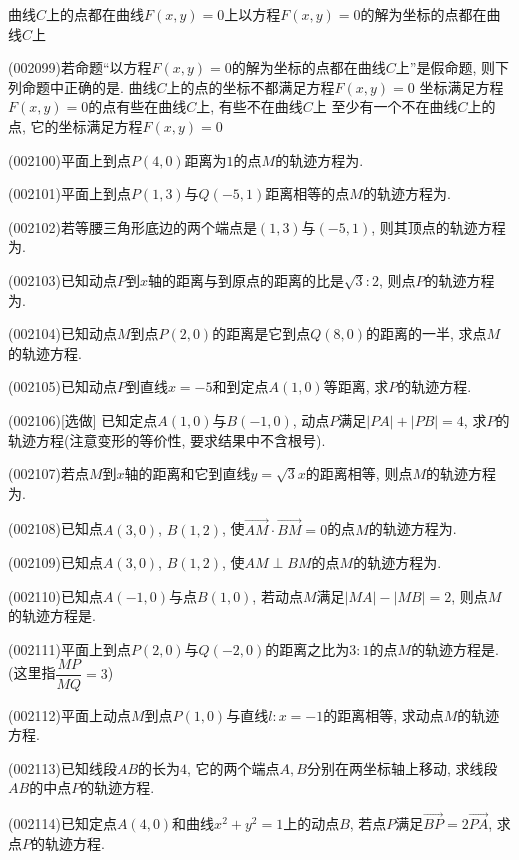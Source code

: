 {曲线$C$上的点都在曲线$F(x,y)=0$上}{以方程$F(x,y)=0$的解为坐标的点都在曲线$C$上}
\item (002099)若命题``以方程$F(x,y)=0$的解为坐标的点都在曲线$C$上''是假命题, 则下列命题中正确的是.
{曲线$C$上的点的坐标不都满足方程$F(x,y)=0$}
{坐标满足方程$F(x,y)=0$的点有些在曲线$C$上, 有些不在曲线$C$上}
{至少有一个不在曲线$C$上的点, 它的坐标满足方程$F(x,y)=0$}
\item (002100)平面上到点$P(4,0)$距离为$1$的点$M$的轨迹方程为.
\item (002101)平面上到点$P(1,3)$与$Q(-5,1)$距离相等的点$M$的轨迹方程为.
\item (002102)若等腰三角形底边的两个端点是$(1,3)$与$(-5,1)$, 则其顶点的轨迹方程为.
\item (002103)已知动点$P$到$x$轴的距离与到原点的距离的比是$\sqrt 3:2$, 则点$P$的轨迹方程为.
\item (002104)已知动点$M$到点$P(2,0)$的距离是它到点$Q(8,0)$的距离的一半, 求点$M$的轨迹方程.
\item (002105)已知动点$P$到直线$x=-5$和到定点$A(1,0)$等距离, 求$P$的轨迹方程.
\item (002106)[选做]
已知定点$A(1,0)$与$B(-1,0)$, 动点$P$满足$|PA|+|PB|=4$, 求$P$的轨迹方程(注意变形的等价性, 要求结果中不含根号).
\item (002107)若点$M$到$x$轴的距离和它到直线$y=\sqrt{3}x$的距离相等, 则点$M$的轨迹方程为.
\item (002108)已知点$A(3,0)$, $B(1,2)$, 使$\overrightarrow{AM}\cdot\overrightarrow{BM}=0$的点$M$的轨迹方程为.
\item (002109)已知点$A(3,0)$, $B(1,2)$, 使$AM\perp BM$的点$M$的轨迹方程为.
\item (002110)已知点$A(-1,0)$与点$B(1,0)$, 若动点$M$满足$|MA|-|MB|=2$, 则点$M$的轨迹方程是.
\item (002111)平面上到点$P(2,0)$与$Q(-2,0)$的距离之比为$3:1$的点$M$的轨迹方程是.(这里指$\dfrac{MP}{MQ}=3$)
\item (002112)平面上动点$M$到点$P(1,0)$与直线$l: x=-1$的距离相等, 求动点$M$的轨迹方程.
\item (002113)已知线段$AB$的长为$4$, 它的两个端点$A,B$分别在两坐标轴上移动, 求线段$AB$的中点$P$的轨迹方程.
\item (002114)已知定点$A(4,0)$和曲线$x^2+y^2=1$上的动点$B$, 若点$P$满足$\overrightarrow{BP}=2\overrightarrow{PA}$, 求点$P$的轨迹方程.
